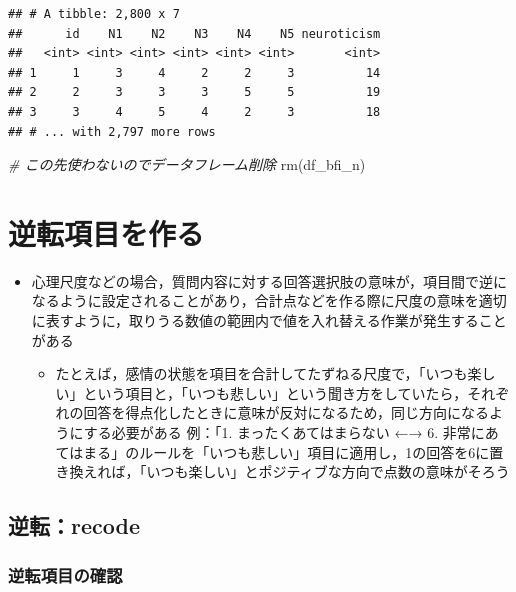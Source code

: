 \documentclass[
  xelatex,ja=standard, b5paper]{bxjsbook}
\newenvironment{Shaded}{\begin{snugshade}}{\end{snugshade}}
\newcommand{\CommentTok}[1]{\textcolor[rgb]{0.56,0.35,0.01}{\textit{#1}}}
\newcommand{\FunctionTok}[1]{\textcolor[rgb]{0.00,0.00,0.00}{#1}}
\newcommand{\NormalTok}[1]{#1}
\providecommand{\tightlist}{%
  \setlength{\itemsep}{0pt}\setlength{\parskip}{0pt}}
\begin{document}
\begin{verbatim}
## # A tibble: 2,800 x 7
##      id    N1    N2    N3    N4    N5 neuroticism
##   <int> <int> <int> <int> <int> <int>       <int>
## 1     1     3     4     2     2     3          14
## 2     2     3     3     3     5     5          19
## 3     3     4     5     4     2     3          18
## # ... with 2,797 more rows
\end{verbatim}

\begin{Shaded}
\begin{Highlighting}[]
\CommentTok{\# この先使わないのでデータフレーム削除}
\FunctionTok{rm}\NormalTok{(df\_bfi\_n)}
\end{Highlighting}
\end{Shaded}

\hypertarget{mu-rev}{%
\section{逆転項目を作る}\label{mu-rev}}

\begin{itemize}
\tightlist
\item
  心理尺度などの場合，質問内容に対する回答選択肢の意味が，項目間で逆になるように設定されることがあり，合計点などを作る際に尺度の意味を適切に表すように，取りうる数値の範囲内で値を入れ替える作業が発生することがある

  \begin{itemize}
  \tightlist
  \item
    たとえば，感情の状態を項目を合計してたずねる尺度で，「いつも楽しい」という項目と，「いつも悲しい」という聞き方をしていたら，それぞれの回答を得点化したときに意味が反対になるため，同じ方向になるようにする必要がある
    例：「1. まったくあてはまらない ←→ 6. 非常にあてはまる」のルールを「いつも悲しい」項目に適用し，1の回答を6に置き換えれば，「いつも楽しい」とポジティブな方向で点数の意味がそろう
  \end{itemize}
\end{itemize}

\hypertarget{mu-rev-recode}{%
\subsection{逆転：recode}\label{mu-rev-recode}}

\hypertarget{mu-rev-check}{%
\subsubsection{逆転項目の確認}\label{mu-rev-check}}
\end{document}
